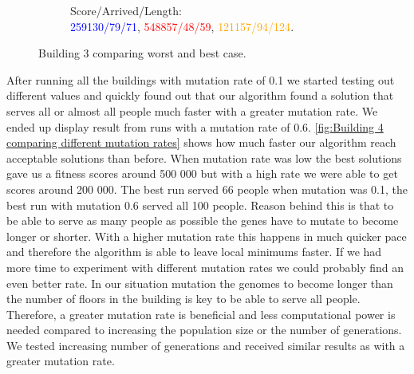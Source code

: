 \begin{figure}[ht]
\begin{subfigure}[b]{0.49\linewidth}
		\captionsetup{justification=centering,font=tiny}
		\caption{Score/Arrived/Length:\\\textcolor{blue}{259130/79/71}, \textcolor{red}{548857/48/59}, \textcolor{orange}{121157/94/124}.}
		\label{fig:Building3/Mutation_0.1/Floors: 50, People: 100, Generation: 1000_1_best}
	\end{subfigure}
	\captionsetup{font=scriptsize}
	\caption{Building 3 comparing worst and best case.}
	\label{fig:Building 3 comparing worst and best case}
\end{figure}

After running all the buildings with mutation rate of 0.1 we started testing out different values and quickly found out that our algorithm found a solution that serves all or almost all people much faster with a greater mutation rate. We ended up display result from runs with a mutation rate of 0.6. \ref{fig:Building 4 comparing different mutation rates} shows how much faster our algorithm reach acceptable solutions than before. When mutation rate was low the best solutions gave us a fitness scores around 500 000 but with a high rate we were able to get scores around 200 000. The best run served 66 people when mutation was 0.1, the best run with mutation 0.6 served all 100 people. Reason behind this is that to be able to serve as many people as possible the genes have to mutate to become longer or shorter. With a higher mutation rate this happens in much quicker pace and therefore the algorithm is able to leave local minimums faster. If we had more time to experiment with different mutation rates we could probably find an even better rate. In our situation mutation the genomes to become longer than the number of floors in the building is key to be able to serve all people. Therefore, a greater mutation rate is beneficial and less computational power is needed compared to increasing the population size or the number of generations. We tested increasing number of generations and received similar results as with a greater mutation rate.

